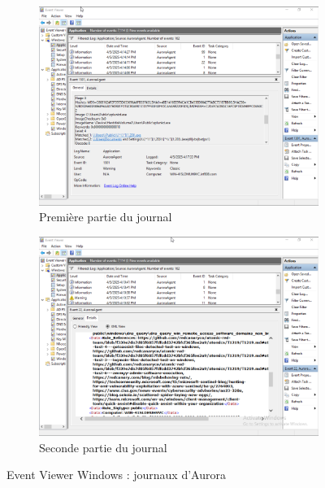 \documentclass[12pt,letterpaper]{article}
\begin{document}
\begin{figure}[h!]
    \centering
    \begin{subfigure}{0.85\textwidth}
        \centering
        \includegraphics[width=1\textwidth]{images/windows/event_viewer1.png}
        \caption{Première partie du journal}
        \label{fig:event_viewer_1}
    \end{subfigure}
    \begin{subfigure}{0.85\textwidth}
        \centering
        \includegraphics[width=1\textwidth]{images/windows/event_viewer2.png}
        \caption{Seconde partie du journal}
        \label{fig:event_viewer_2}
    \end{subfigure}
    \caption{Event Viewer Windows : journaux d'Aurora}
    \label{fig:event_viewer}
\end{figure}
\end{document}
